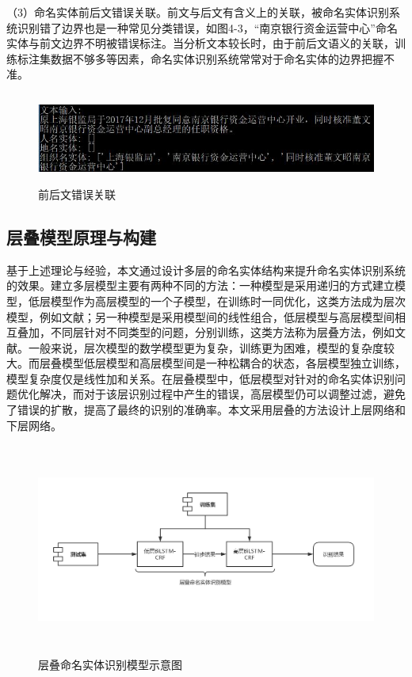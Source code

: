 \documentclass[winfonts,master,oneside,nobackinfo]{njuthesis}
\begin{document}
（3）命名实体前后文错误关联。前文与后文有含义上的关联，被命名实体识别系统识别错了边界也是一种常见分类错误，如图4-3，“南京银行资金运营中心”命名实体与前文边界不明被错误标注。当分析文本较长时，由于前后文语义的关联，训练标注集数据不够多等因素，命名实体识别系统常常对于命名实体的边界把握不准。


\begin{figure}[H]
\centering
\begin{minipage}[t]{\textwidth}
\includegraphics[width=1\textwidth,height=3cm]{./figure/前后文错误关联.jpg}
\caption{前后文错误关联}
\label{lab:1}
\end{minipage}
\end{figure}

\subsection{层叠模型原理与构建}

基于上述理论与经验，本文通过设计多层的命名实体结构来提升命名实体识别系统的效果。建立多层模型主要有两种不同的方法：一种模型是采用递归的方式建立模型，低层模型作为高层模型的一个子模型，在训练时一同优化，这类方法成为层次模型，例如文献\cite{taobao}；另一种模型是采用模型间的线性组合，低层模型与高层模型间相互叠加，不同层针对不同类型的问题，分别训练，这类方法称为层叠方法，例如文献\cite{Yixue}\cite{Jia}。一般来说，层次模型的数学模型更为复杂，训练更为困难，模型的复杂度较大。而层叠模型低层模型和高层模型间是一种松耦合的状态，各层模型独立训练，模型复杂度仅是线性加和关系。在层叠模型中，低层模型对针对的命名实体识别问题优化解决，而对于该层识别过程中产生的错误，高层模型仍可以调整过滤，避免了错误的扩散，提高了最终的识别的准确率。本文采用层叠的方法设计上层网络和下层网络。

\begin{figure}[H]
\centering
\begin{minipage}[t]{\textwidth}
\includegraphics[width=1\textwidth,height=7cm]{./figure/层叠模型.jpg}
\caption{层叠命名实体识别模型示意图}
\label{lab:1}
\end{minipage}
\end{figure}
\end{document}
